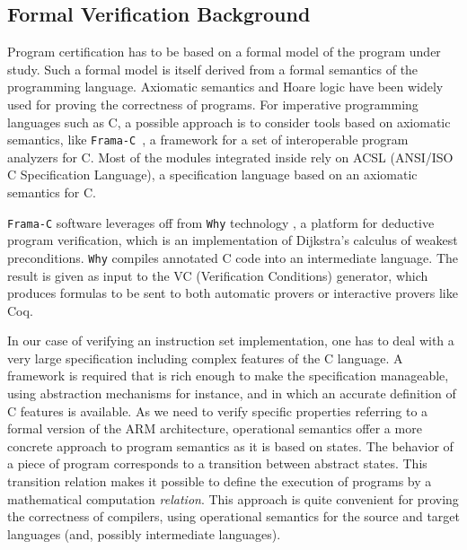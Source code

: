 \documentclass{llncs}
\newcommand{\why}{\texttt{Why}\xspace}
\newcommand{\framac}{\texttt{Frama-C}\xspace}
\begin{document}
\subsection{Formal Verification Background} %
\label{background}

Program certification has to be based on a formal model of the program
under study.  Such a formal model is itself derived from a formal
semantics of the programming language.
Axiomatic semantics and Hoare logic %
have been widely used for proving the correctness of programs.  For
imperative programming languages such as C, a possible approach is to
consider tools based on axiomatic semantics, like
\framac~\cite{canet2009value}, a framework for a set of interoperable
program analyzers for C. Most of the modules integrated inside rely on
ACSL (ANSI/ISO C Specification Language), a specification language
based on an axiomatic semantics for C.

\framac software leverages off from \why technology
\cite{bobot2011why3,filliatre07cav}, a platform for deductive program
verification, which is an implementation of Dijkstra's calculus of
weakest preconditions.  \why compiles annotated C code into an
intermediate language.  The result is given as input to the VC
(Verification Conditions) generator, which produces formulas to be
sent to both automatic provers or interactive provers like Coq.

In our case of verifying an instruction set implementation, one has to
deal with a very large specification including complex features of the
C language. A framework is required that is rich enough to make the
specification manageable, using abstraction mechanisms for instance,
and in which an accurate definition of C features is available.  As we
need to verify specific properties referring to a formal version of
the ARM architecture, operational semantics offer a more concrete
approach to program semantics as it is based on states. The behavior
of a piece of program corresponds to a transition between abstract
states.  This transition relation makes it possible to define the
execution of programs by a mathematical computation \emph{relation}.
This approach is quite convenient for proving the correctness of
compilers, using operational semantics for the source and target
languages (and, possibly intermediate languages).
\end{document}
